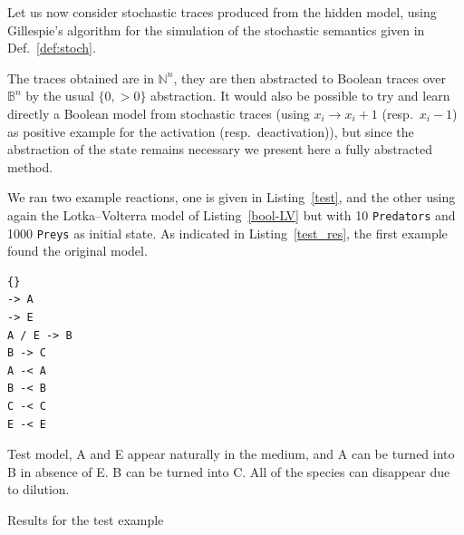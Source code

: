 \documentclass{llncs}
\newif\ifcomments
\newcommand{\sylvain}[1]{\ifcomments \textcolor{green}{#1} \fi}
\newcommand{\lra}{\longrightarrow}
\begin{document}
Let us now consider stochastic traces %
produced from the hidden model, using Gillespie's
algorithm for the simulation of the stochastic semantics given in
Def.~\ref{def:stoch}.

The traces obtained are in ${\mathbb{N}}^n$, they are then abstracted to
Boolean traces over ${\mathbb{B}}^n$ by the usual $\{0, >0\}$ abstraction.
It would also be possible to try and learn directly a Boolean model from
stochastic traces (using $x_i\lra x_i+1$ (resp.\ $x_i-1$) as positive example for the
activation (resp.\ deactivation)), but since the abstraction of the state
remains necessary we present here a fully abstracted method.



We ran two example reactions, one is given in Listing~\ref{test}, and the
other using again the Lotka--Volterra model of Listing~\ref{bool-LV} but with 10
\texttt{Predators} and 1000 \texttt{Preys} as initial state.
As indicated in Listing~\ref{test_res}, the first example found the original
model.

\begin{listfig}[htb]
   \begin{lstlisting}
{}
-> A
-> E
A / E -> B
B -> C
A -< A
B -< B
C -< C
E -< E
   \end{lstlisting}
	\caption{Test model, A and E appear naturally in the medium, and A can be turned into B in absence of E. B  can be turned into C. All of the species can disappear due to dilution.\label{test}}
\end{listfig}
\begin{listfig}[htb]
	
	\caption{Results for the test example\label{test_res}}
\end{listfig}


\end{document}
